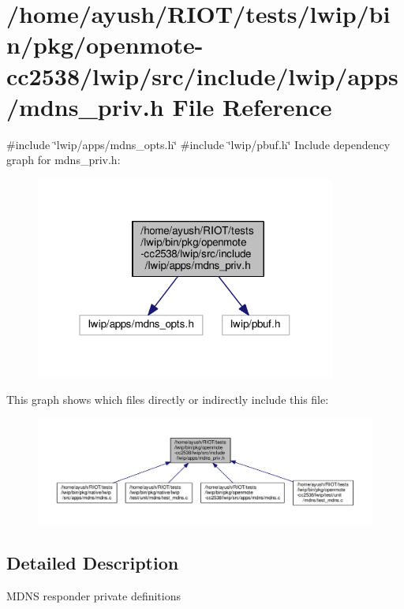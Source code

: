 \hypertarget{openmote-cc2538_2lwip_2src_2include_2lwip_2apps_2mdns__priv_8h}{}\section{/home/ayush/\+R\+I\+O\+T/tests/lwip/bin/pkg/openmote-\/cc2538/lwip/src/include/lwip/apps/mdns\+\_\+priv.h File Reference}
\label{openmote-cc2538_2lwip_2src_2include_2lwip_2apps_2mdns__priv_8h}
{\ttfamily \#include \char`\"{}lwip/apps/mdns\+\_\+opts.\+h\char`\"{}}\newline
{\ttfamily \#include \char`\"{}lwip/pbuf.\+h\char`\"{}}\newline
Include dependency graph for mdns\+\_\+priv.\+h\+:
\nopagebreak
\begin{figure}[H]
\begin{center}
\leavevmode
\includegraphics[width=280pt]{openmote-cc2538_2lwip_2src_2include_2lwip_2apps_2mdns__priv_8h__incl}
\end{center}
\end{figure}
This graph shows which files directly or indirectly include this file\+:
\nopagebreak
\begin{figure}[H]
\begin{center}
\leavevmode
\includegraphics[width=350pt]{openmote-cc2538_2lwip_2src_2include_2lwip_2apps_2mdns__priv_8h__dep__incl}
\end{center}
\end{figure}


\subsection{Detailed Description}
M\+D\+NS responder private definitions 